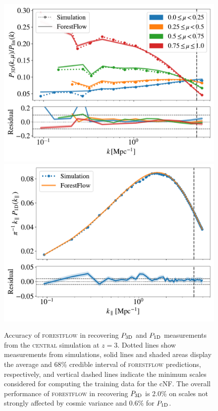 \documentclass[longauth]{aa}
\newcommand{\poned}{\ensuremath{P_{\rm 1D}}\xspace}
\newcommand{\pthreed}{\ensuremath{P_{\rm 3D}}\xspace}
\newcommand{\forestflow}{\textsc{forestflow}\xspace}
\newcommand{\simcentral}{\textsc{central}\xspace}
\begin{document}
\begin{figure}
\includegraphics[width= 0.95\columnwidth]{figures/p3d_snap.pdf}
\includegraphics[width= 0.97\columnwidth]{figures/p1d_snap.pdf}
\centering
\caption{Accuracy of \forestflow in recovering \pthreed and \poned measurements from the \simcentral simulation at $z=3$. Dotted lines show measurements from simulations, solid lines and shaded areas display the average and 68\% credible interval of \forestflow predictions, respectively, and vertical dashed lines indicate the minimum scales considered for computing the training data for the cNF. The overall performance of \forestflow in recovering \pthreed is 2.0\% on scales not strongly affected by cosmic variance and 0.6\% for \poned.
}
\label{fig:test_snap}
\end{figure}
\end{document}
